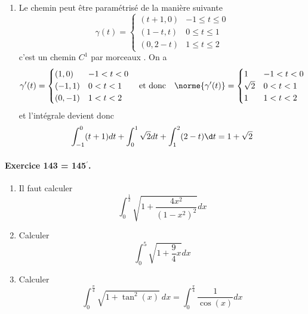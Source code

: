 \begin{enumerate}
\item Le chemin peut être paramétrisé de la manière suivante
\begin{equation*}
\gamma(t) =%
\begin{cases}
(t+1,0) & -1 \leq t \leq 0\\
(1-t,t) & 0 \leq t \leq 1\\
(0,2-t) & 1 \leq t \leq 2
\end{cases}
\end{equation*}
c'est un chemin $C^1$ par morceaux%
. On a
\begin{equation*}
\gamma^\prime(t) =%
\begin{cases}
(1,0) & -1 < t < 0\\
(-1,1) & 0 < t < 1\\
(0,-1) & 1 < t < 2
\end{cases}%
\quad\text{et donc}\quad%
\norme{\gamma^\prime(t)} =%
\begin{cases}
1 & -1 < t < 0\\
\sqrt2 & 0 < t < 1\\
1 & 1 < t < 2
\end{cases}%
\end{equation*}
et l'intégrale devient donc
\begin{equation*}
\int_{-1}^0 (t+1) d t + \int_0^1 \sqrt2 d t + \int_1^2 (2-t) \d
t = 1+\sqrt2
\end{equation*}
\end{enumerate}


\paragraph{Exercice 143 = 145$^\prime$.}
\begin{enumerate}
\item Il faut calculer
\begin{equation*}
\int_0^{\frac{1}{2}} \sqrt{1 + \frac{4 x^2}{(1-x^2)^2}} d x
\end{equation*}

\item Calculer
\begin{equation*}
\int_0^{5} \sqrt{1 + \frac94 x} d x
\end{equation*}

\item Calculer
\begin{equation*}
\int_0^{\frac\pi4} \sqrt{1 + \tan^2(x)}\ d x = \int_0^{\frac\pi4} \frac{1}{\cos(x)} d x
\end{equation*}
\end{enumerate}

